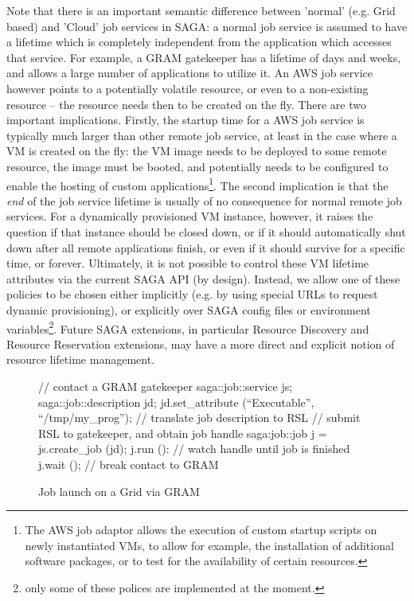 \documentclass[conference,final]{IEEEtran}
\newcommand{\upp}{\vspace*{-0.6em}}
\newcommand{\I}[1]{\textit{#1}}
\begin{document}
Note that there is an important semantic difference between 'normal'
(e.g. Grid based) and 'Cloud' job services in SAGA: a normal job
service is assumed to have a lifetime which is completely independent
from the application which accesses that service.  For example, a GRAM
gatekeeper has a lifetime of days and weeks, and allows a large number
of applications to utilize it.  An AWS job service however points to a
potentially volatile resource, or even to a non-existing resource --
the resource needs then to be created on the fly.  There are two
important implications.  Firstly, the startup time for a AWS job
service is typically much larger than other remote job service, at
least in the case where a VM is created on the fly: the VM image needs
to be deployed to some remote resource, the image must be booted, and
potentially needs to be configured to enable the hosting of custom
applications\footnote{The AWS job adaptor allows the execution of
  custom startup scripts on newly instantiated VMs, to allow for
  example, the installation of additional software packages, or to
  test for the availability of certain resources.}.  The second
implication is that the \I{end} of the job service lifetime is usually
of no consequence for normal remote job services.  For a dynamically
provisioned VM instance, however, it raises the question if that
instance should be closed down, or if it should automatically shut
down after all remote applications finish, or even if it should
survive for a specific time, or forever.  Ultimately, it is not
possible to control these VM lifetime attributes via the current SAGA
API (by design).  Instead, we allow one of these policies to be
chosen either implicitly (e.g. by using special URLs to request
dynamic provisioning), or explicitly over SAGA config files or
environment variables\footnote{only some of these polices are
  implemented at the moment.}.  Future SAGA extensions, in particular
Resource Discovery and Resource Reservation extensions, may have a
more direct and explicit notion of resource lifetime management.

\begin{figure}[!ht]
\upp 
 \begin{center}
  \begin{mycode}[label=SAGA Job Launch via GRAM gatekeeper]
  { // contact a GRAM gatekeeper
    saga::job::service     js;
    saga::job::description jd;
    jd.set_attribute (``Executable'', ``/tmp/my_prog'');
    // translate job description to RSL
    // submit RSL to gatekeeper, and obtain job handle
    saga:job::job j = js.create_job (jd);
    j.run ():
    // watch handle until job is finished
    j.wait ();
   } // break contact to GRAM
  \end{mycode}
  \caption{\label{gramjob}Job launch on a Grid via GRAM\vspace*{-2em}}
 \end{center}
\upp
\end{figure}
\end{document}
